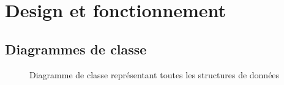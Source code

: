 \documentclass[a4paper]{report}
\begin{document}
\section{Design et fonctionnement}
\subsection{Diagrammes de classe}

\newpage
\begin{figure}[H]
    \vspace*{-3cm}
    \caption{\label{3} Diagramme de classe représentant toutes les structures de données}
\end{figure}
\newpage
\end{document}

